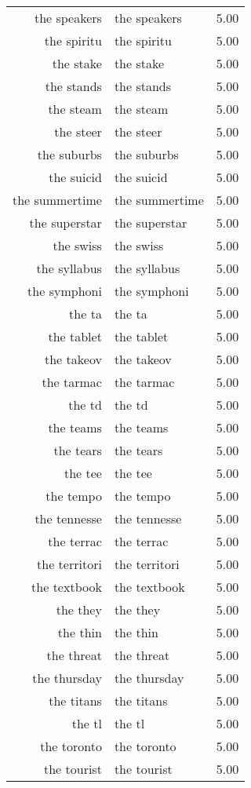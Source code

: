\begin{table}[ht]
\begin{tabular}{rlr}
  the speakers & the speakers & 5.00 \\ 
  the spiritu & the spiritu & 5.00 \\ 
  the stake & the stake & 5.00 \\ 
  the stands & the stands & 5.00 \\ 
  the steam & the steam & 5.00 \\ 
  the steer & the steer & 5.00 \\ 
  the suburbs & the suburbs & 5.00 \\ 
  the suicid & the suicid & 5.00 \\ 
  the summertime & the summertime & 5.00 \\ 
  the superstar & the superstar & 5.00 \\ 
  the swiss & the swiss & 5.00 \\ 
  the syllabus & the syllabus & 5.00 \\ 
  the symphoni & the symphoni & 5.00 \\ 
  the ta & the ta & 5.00 \\ 
  the tablet & the tablet & 5.00 \\ 
  the takeov & the takeov & 5.00 \\ 
  the tarmac & the tarmac & 5.00 \\ 
  the td & the td & 5.00 \\ 
  the teams & the teams & 5.00 \\ 
  the tears & the tears & 5.00 \\ 
  the tee & the tee & 5.00 \\ 
  the tempo & the tempo & 5.00 \\ 
  the tennesse & the tennesse & 5.00 \\ 
  the terrac & the terrac & 5.00 \\ 
  the territori & the territori & 5.00 \\ 
  the textbook & the textbook & 5.00 \\ 
  the they & the they & 5.00 \\ 
  the thin & the thin & 5.00 \\ 
  the threat & the threat & 5.00 \\ 
  the thursday & the thursday & 5.00 \\ 
  the titans & the titans & 5.00 \\ 
  the tl & the tl & 5.00 \\ 
  the toronto & the toronto & 5.00 \\ 
  the tourist & the tourist & 5.00 \\ 

\end{tabular}
\end{table}
